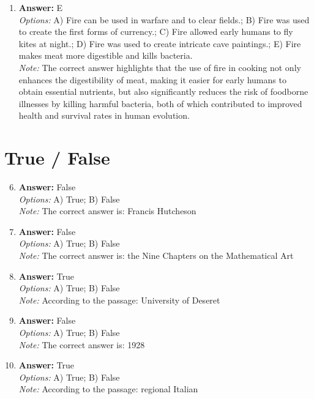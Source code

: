 \documentclass[12pt]{article}
\begin{document}
\begin{enumerate}[label=\arabic*.]
\\ \textit{Options:} A) the presence of a nearby museum or storage facility.; B) naturally exposed layers in which to search for artifacts, ecofacts, or bone.; C) the accessibility of the site by public transportation.; D) the presence of primary and secondary refuse.; E) the existence of a cache or collection of artifacts.
\\ \textit{Note:} The appropriateness and usefulness of pedestrian survey relies on the presence of naturally exposed layers that facilitate the visibility and accessibility of artifacts, ecofacts, or bone, which are essential for effective archaeological investigation.
\item \textbf{Answer:} E
\\ \textit{Options:} A) Fire can be used in warfare and to clear fields.; B) Fire was used to create the first forms of currency.; C) Fire allowed early humans to fly kites at night.; D) Fire was used to create intricate cave paintings.; E) Fire makes meat more digestible and kills bacteria.
\\ \textit{Note:} The correct answer highlights that the use of fire in cooking not only enhances the digestibility of meat, making it easier for early humans to obtain essential nutrients, but also significantly reduces the risk of foodborne illnesses by killing harmful bacteria, both of which contributed to improved health and survival rates in human evolution.
\end{enumerate}

\section*{True / False}
\begin{enumerate}[label=\arabic*.]
\setcounter{enumi}{5}
\item \textbf{Answer:} False
\\ \textit{Options:} A) True; B) False
\\ \textit{Note:} The correct answer is: Francis Hutcheson
\item \textbf{Answer:} False
\\ \textit{Options:} A) True; B) False
\\ \textit{Note:} The correct answer is: the Nine Chapters on the Mathematical Art
\item \textbf{Answer:} True
\\ \textit{Options:} A) True; B) False
\\ \textit{Note:} According to the passage: University of Deseret
\item \textbf{Answer:} False
\\ \textit{Options:} A) True; B) False
\\ \textit{Note:} The correct answer is: 1928
\item \textbf{Answer:} True
\\ \textit{Options:} A) True; B) False
\\ \textit{Note:} According to the passage: regional Italian
\end{enumerate}
\end{document}
